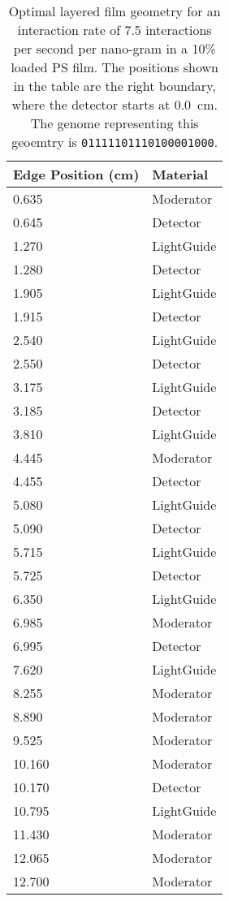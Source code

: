 \begin{table}
	\caption[Optimal Layered Film Geometry for 7.5 interaction per second per nanogram Cf-252]{Optimal layered film geometry for an interaction rate of 7.5 interactions per second per nano-gram  in a 10\%  loaded PS film. The positions shown in the table are the right boundary, where the detector starts at \SI{0.0}{\cm}. The genome representing this geoemtry is \texttt{01111101110100001000}.}
	\label{tab:OptGeoDetailed75}
	\begin{tabular}{m{3cm} m{4cm}}
	\toprule
	Edge Position (\si{\cm}) & Material \\
	\midrule
0.635&Moderator\\
0.645&Detector\\
1.270&LightGuide\\
1.280&Detector\\
1.905&LightGuide\\
1.915&Detector\\
2.540&LightGuide\\
2.550&Detector\\
3.175&LightGuide\\
3.185&Detector\\
3.810&LightGuide\\
4.445&Moderator\\
4.455&Detector\\
5.080&LightGuide\\
5.090&Detector\\
5.715&LightGuide\\
5.725&Detector\\
6.350&LightGuide\\
6.985&Moderator\\
6.995&Detector\\
7.620&LightGuide\\
8.255&Moderator\\
8.890&Moderator\\
9.525&Moderator\\
10.160&Moderator\\
10.170&Detector\\
10.795&LightGuide\\
11.430&Moderator\\
12.065&Moderator\\
12.700&Moderator\\
	\bottomrule
	\end{tabular}
\end{table}
